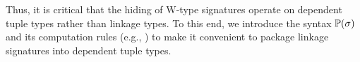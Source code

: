 %
%

Thus, it is critical that the hiding of W-type signatures operate on dependent
tuple types rather than linkage types.
To this end, we introduce the syntax $\mathbb{P}({\sigma})$ and its computation rules
(e.g., ) to make it convenient to package linkage signatures
into dependent tuple types.







%

